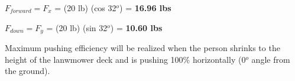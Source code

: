





$F_{forward} = F_x$ = (20 lb) (cos 32$^{o}$) = {\bf 16.96 lbs}

\vskip 10pt

$F_{down} = F_y$ = (20 lb) (sin 32$^{o}$) = {\bf 10.60 lbs}

\vskip 10pt

Maximum pushing efficiency will be realized when the person shrinks to the height of the lanwmower deck and is pushing 100\% horizontally (0$^{o}$ angle from the ground).











